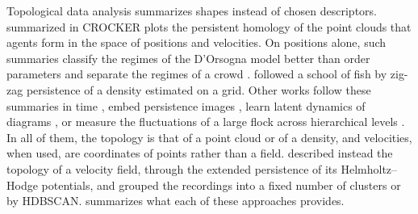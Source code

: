 Topological data analysis summarizes shapes instead of chosen descriptors. \citet{topaz2015topological} summarized in
CROCKER plots the persistent homology of the point clouds that agents form in the space of positions and velocities. On
positions alone, such summaries classify the regimes of the D'Orsogna model better than order parameters
\citep{bhaskar2019analyzing} and separate the regimes of a crowd \citep{kern2026study}. \citet{corcoran2017modelling}
followed a school of fish by zig-zag persistence of a density estimated on a grid. Other works follow these summaries in
time \citep{xian2022capturing,sathiyakumar2024detecting}, embed persistence images \citep{suetani2025unsupervised},
learn latent dynamics of diagrams \citep{zeng2024neural}, or measure the fluctuations of a large flock across
hierarchical levels \citep{mototake2024topological}. In all of them, the topology is that of a point cloud or of a
density, and velocities, when used, are coordinates of points rather than a field. \citet{legarda2026universal}
described instead the topology of a velocity field, through the extended persistence of its Helmholtz--Hodge
potentials, and grouped the recordings into a fixed number of clusters or by HDBSCAN.  summarizes what
each of these approaches provides.

